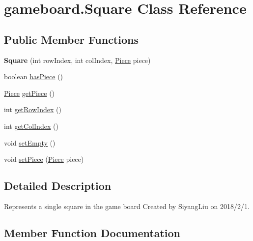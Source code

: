 \hypertarget{classgameboard_1_1_square}{}\section{gameboard.\+Square Class Reference}
\label{classgameboard_1_1_square}
\subsection*{Public Member Functions}
\begin{DoxyCompactItemize}
\item 
\mbox{\label{classgameboard_1_1_square_a4ca76f3829c4ddbc95a4bfad30896338}} 
{\bfseries Square} (int row\+Index, int col\+Index, \mbox{\hyperlink{classpieces_1_1_piece}{Piece}} piece)
\item 
boolean \mbox{\hyperlink{classgameboard_1_1_square_a0ad09157aca37441420daf27de6a2f63}{has\+Piece}} ()
\item 
\mbox{\hyperlink{classpieces_1_1_piece}{Piece}} \mbox{\hyperlink{classgameboard_1_1_square_a7c261d1ec58046f8b580efe45e751382}{get\+Piece}} ()
\item 
int \mbox{\hyperlink{classgameboard_1_1_square_a45ee059f08475d6d83571857f8e8f6ae}{get\+Row\+Index}} ()
\item 
int \mbox{\hyperlink{classgameboard_1_1_square_a821e41d4a1343edd5804c280a032871d}{get\+Col\+Index}} ()
\item 
void \mbox{\hyperlink{classgameboard_1_1_square_abc200e09f6066535d09eab796688eabe}{set\+Empty}} ()
\item 
void \mbox{\hyperlink{classgameboard_1_1_square_ae3145cd4d46cf412624aef20c03b002b}{set\+Piece}} (\mbox{\hyperlink{classpieces_1_1_piece}{Piece}} piece)
\end{DoxyCompactItemize}


\subsection{Detailed Description}
Represents a single square in the game board Created by Siyang\+Liu on 2018/2/1. 

\subsection{Member Function Documentation}
\mbox{\label{classgameboard_1_1_square_a821e41d4a1343edd5804c280a032871d}} 
